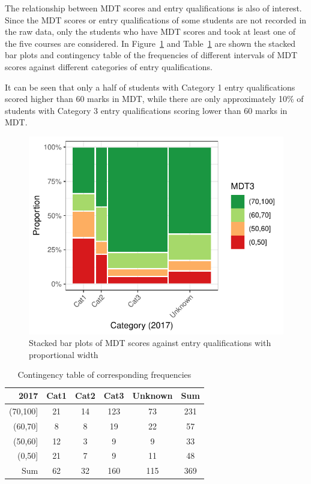 \documentclass[a4paper]{report}
\begin{document}
The relationship between MDT scores and entry qualifications is also of interest. Since the MDT scores or entry qualifications of some students are not recorded in the raw data, only the students who have MDT scores and took at least one of the five courses are considered. In Figure~\ref{fig:REL_MDT_vs_Qual} and Table~\ref{tab:REL_MDT_vs_Qual} are shown the stacked bar plots and contingency table of the frequencies of different intervals of MDT scores against different categories of entry qualifications. 

It can be seen that only a half of students with Category 1 entry qualifications scored higher than 60 marks in MDT, while there are only approximately 10\% of students with Category 3 entry qualifications scoring lower than 60 marks in MDT. 

\begin{figure}[H]
  \centering
  \includegraphics[width=.7\linewidth]{fig/REL_MDT_vs_Qual.pdf}
  \caption{\label{fig:REL_MDT_vs_Qual}Stacked bar plots of MDT scores against entry qualifications with proportional width}
\end{figure}

\begin{table}[H]
  \centering
  \begin{tabular}{r|cccc|c}
    \hline
   2017 & Cat1 & Cat2 & Cat3 & Unknown & Sum \\ 
   \hline
   (70,100] & 21 & 14 & 123 & 73 & 231 \\ 
     (60,70] & 8 & 8 & 19 & 22 & 57 \\ 
     (50,60] & 12 & 3 & 9 & 9 & 33 \\ 
     (0,50] & 21 & 7 & 9 & 11 & 48 \\ 
    \hline
     Sum & 62 & 32 & 160 & 115 & 369 \\ 
      \hline
  \end{tabular}
  \caption{\label{tab:REL_MDT_vs_Qual}Contingency table of corresponding frequencies}
\end{table}
\end{document}
